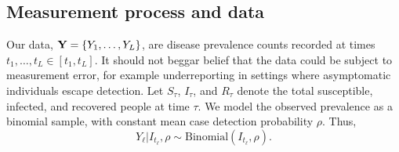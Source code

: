 \subsection{Measurement process and data}
\label{subsec:bda_meas_proc}
Our data, $\mathbf{Y} = \lbrace Y_{1}, \dots, Y_L \rbrace$, are disease prevalence counts recorded at times $t_1,\dots,t_L \in [t_1,t_L]$. It should not beggar belief that the data could be subject to measurement error, for example underreporting in settings where asymptomatic individuals escape detection. Let $ S_\tau $, $ I_\tau $, and $ R_\tau $ denote the total susceptible, infected, and recovered people at time $ \tau $. We model the observed prevalence as a binomial sample, with constant mean case detection probability $ \rho $. Thus,
\begin{equation}\label{eqn:bda_emit_dist}
Y_\ell | I_{t_\ell},\rho \sim \mathrm{Binomial}\left (I_{t_\ell}, \rho\right ).\end{equation}

